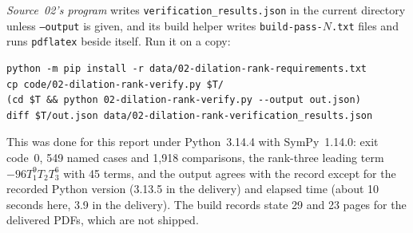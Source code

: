 \documentclass[11pt,letterpaper]{article}
\numberwithin{equation}{section}
\theoremstyle{definition}
\theoremstyle{remark}
\begin{document}
\emph{Source~02's program} writes \texttt{verification\_results.json} in the
current directory unless \texttt{--output} is given, and its build helper
writes \texttt{build-pass-}$N$\texttt{.txt} files and runs \texttt{pdflatex}
beside itself. Run it on a copy:
\begin{verbatim}
python -m pip install -r data/02-dilation-rank-requirements.txt
cp code/02-dilation-rank-verify.py $T/
(cd $T && python 02-dilation-rank-verify.py --output out.json)
diff $T/out.json data/02-dilation-rank-verification_results.json
\end{verbatim}
This was done for this report under Python~3.14.4 with SymPy~1.14.0: exit
code~0, 549 named cases and 1,918 comparisons, the rank-three leading term
$-96T_1^9T_2T_3^6$ with 45 terms, and the output agrees with the record except
for the recorded Python version (3.13.5 in the delivery) and elapsed time
(about 10 seconds here, 3.9 in the delivery). The build records state 29 and
23 pages for the delivered PDFs, which are not shipped.
\end{document}
